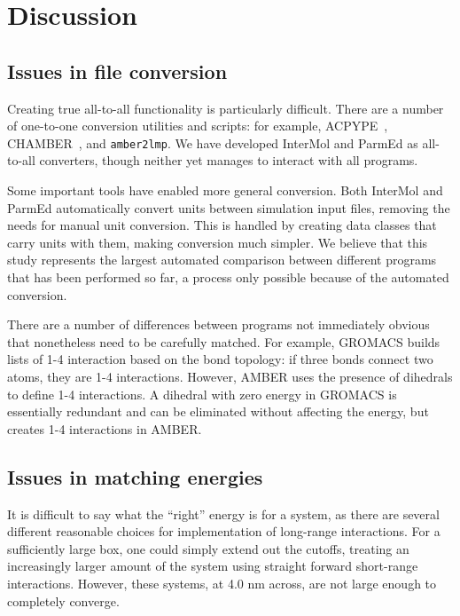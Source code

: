 \section*{Discussion}

\subsection*{Issues in file conversion}
Creating true all-to-all functionality is particularly
difficult. There are a number of one-to-one conversion utilities and
scripts: for example, ACPYPE~\cite{sousa_da_silva_acpype_2012},
CHAMBER~\citep{crowley_chamber:_2009}, and {\tt amber2lmp}.  We have
developed InterMol and ParmEd as all-to-all converters, though neither
yet manages to interact with all programs.

Some important tools have enabled more general conversion. Both
InterMol and ParmEd automatically convert units between simulation
input files, removing the needs for manual unit conversion. This is
handled by creating data classes that carry units with them, making
conversion much simpler.  We believe that this study represents the
largest automated comparison between different programs that has been
performed so far, a process only possible because of the automated
conversion.

There are a number of differences between programs not immediately
obvious that nonetheless need to be carefully matched.  For example,
GROMACS builds lists of 1-4 interaction based on the bond topology: if
three bonds connect two atoms, they are 1-4 interactions. However,
AMBER uses the presence of dihedrals to define 1-4 interactions. A
dihedral with zero energy in GROMACS is essentially redundant and can
be eliminated without affecting the energy, but creates 1-4
interactions in AMBER.

\subsection*{Issues in matching energies}

It is difficult to say what the ``right'' energy is for a system, as
there are several different reasonable choices for implementation of
long-range interactions. For a sufficiently large box, one could
simply extend out the cutoffs, treating an increasingly larger amount
of the system using straight forward short-range interactions.
However, these systems, at 4.0 nm across, are not large enough to
completely converge.

